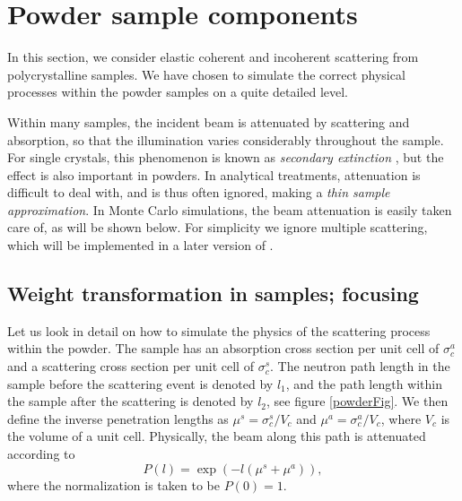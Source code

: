 
\section{Powder sample components}
\label{powder}
In this section, we consider elastic coherent and incoherent
scattering from polycrystalline samples. We have chosen to
simulate the correct physical processes within the powder
samples on a quite detailed level.

Within many samples,
the incident beam is attenuated by scattering and absorption,
so that the illumination varies considerably throughout the sample.
For single crystals, this phenomenon is known as
{\em secondary extinction} \cite{bacon}, but the effect is
also important in powders.
In analytical treatments, attenuation is difficult to deal with,
and is thus often ignored, making a {\em thin sample approximation}.
In Monte Carlo simulations, the beam attenuation
is easily taken care of, as will be shown below.
For simplicity we ignore multiple scattering, which will
be implemented in a later version of \MCS .

\subsection{Weight transformation in samples; focusing}
Let us look in detail on how to simulate the physics of the scattering
process within the powder.
The sample has an absorption cross section per unit cell of
$\sigma_c^a$ and a scattering cross section per unit cell
of $\sigma_c^s$. The neutron path length
in the sample before the scattering event is denoted by $l_1$, and
the path length within the sample after the scattering
is denoted by $l_2$, see figure \ref{powderFig}.
We then define the inverse penetration lengths as
$\mu^s = \sigma_c^s / V_c$ and $\mu^a = \sigma_c^a / V_c$, where
$V_c$ is the volume of a unit cell. Physically, the beam
along this path is attenuated according to
\begin{equation}
P(l) = \exp(- l (\mu^s + \mu^a)) ,
\end{equation}
where the normalization is taken to be $P(0)=1$.

